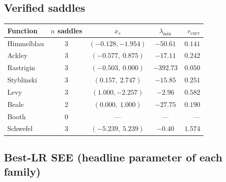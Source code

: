 \documentclass[11pt]{article}
\begin{document}
\subsection{Verified saddles}

\begin{center}
\begin{tabular}{lcccr}
\toprule
Function & $n$ saddles & $x_s$ & $\lambda_{\min}$ & $r_{\mathrm{curv}}$ \\
\midrule
Himmelblau & 3 & $(-0.128,-1.954)$ & $-50.61$ & $0.141$ \\
Ackley     & 3 & $(-0.577,\ 0.875)$ & $-17.11$ & $0.242$ \\
Rastrigin  & 3 & $(-0.503,\ 0.000)$ & $-392.73$ & $0.050$ \\
Styblinski & 3 & $(0.157,\ 2.747)$ & $-15.85$ & $0.251$ \\
Levy       & 3 & $(1.000,-2.257)$ & $-2.96$ & $0.582$ \\
Beale      & 2 & $(0.000,\ 1.000)$ & $-27.75$ & $0.190$ \\
Booth      & 0 & --- & --- & --- \\
Schwefel   & 3 & $(-5.239,\ 5.239)$ & $-0.40$ & $1.574$ \\
\bottomrule
\end{tabular}
\end{center}

\subsection{Best-LR SEE (headline parameter of each family)}
\end{document}

